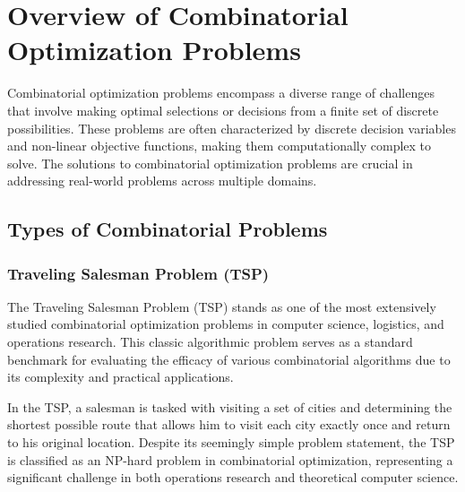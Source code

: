 \documentclass[11pt]{report}
\begin{document}
    \section{Overview of Combinatorial Optimization Problems}
    Combinatorial optimization problems encompass a diverse range of challenges that involve making optimal selections or decisions from a finite set of discrete possibilities\cite{papadimitriou1998combinatorial}. These problems are often characterized by discrete decision variables and non-linear objective functions, making them computationally complex to solve\cite{korte2011combinatorial}. The solutions to combinatorial optimization problems are crucial in addressing real-world problems across multiple domains. 
        \subsection{Types of Combinatorial Problems}

        \subsubsection{Traveling Salesman Problem (TSP)}
        The Traveling Salesman Problem (TSP) stands as one of the most extensively studied combinatorial optimization problems in computer science, logistics, and operations research. This classic algorithmic problem serves as a standard benchmark for evaluating the efficacy of various combinatorial algorithms due to its complexity and practical applications.

        In the TSP, a salesman is tasked with visiting a set of cities and determining the shortest possible route that allows him to visit each city exactly once and return to his original location. Despite its seemingly simple problem statement, the TSP is classified as an NP-hard problem in combinatorial optimization, representing a significant challenge in both operations research and theoretical computer science.
\end{document}
